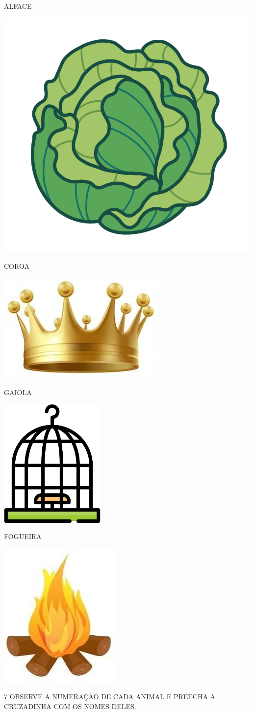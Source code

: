 \begin{multicols}{2}
\begin{escolha}
\item ALFACE

\includegraphics[width=.2\textwidth]{media/image86.png}

\item COROA

\includegraphics[width=.15\textwidth]{media/image87.jpg}

\columnbreak

\item GAIOLA

\includegraphics[width=.1\textwidth]{media/image88.png}

\item FOGUEIRA

\includegraphics[width=.1\textwidth]{media/image89.jpg}
\end{escolha}
\end{multicols}


\pagebreak
\num{7} OBSERVE A NUMERAÇÃO DE CADA ANIMAL E PREECHA A CRUZADINHA COM OS NOMES DELES.


